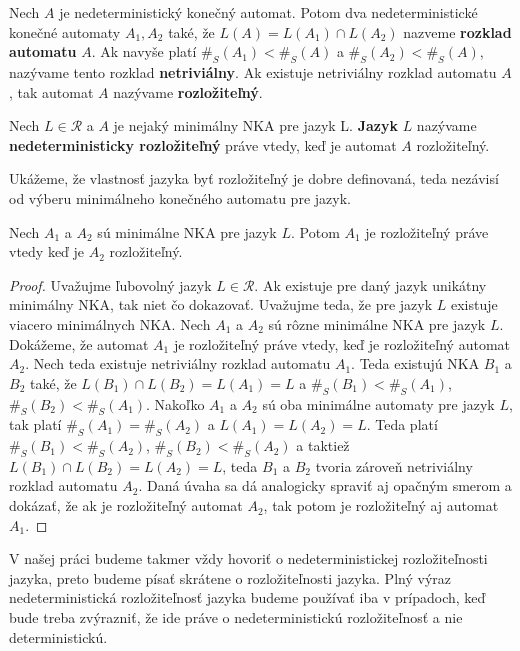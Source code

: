 \begin{definition}
Nech $ A $ je nedeterministický konečný automat. Potom dva nedeterministické konečné automaty $ A_1, A_2 $ také, že $ L(A)=L(A_1) \cap L(A_2) $ nazveme \textbf{rozklad automatu} $ A $. Ak navyše platí $ \#_S(A_1) < \#_S(A)$ a $ \#_S(A_2) < \#_S(A) $, nazývame tento rozklad \textbf{netriviálny}. Ak existuje netriviálny rozklad automatu $ A $, tak automat $ A $ nazývame \textbf{rozložiteľný}.
\end{definition}

\begin{definition}
\label{def:nedeterministic_decomposability_of_language}
Nech $ L \in \mathscr{R} $ a $ A $ je nejaký minimálny NKA pre jazyk L. \textbf{Jazyk} $ L $ nazývame \textbf{nedeterministicky rozložiteľný} práve vtedy, keď je automat $ A $ rozložiteľný.
\end{definition}

Ukážeme, že vlastnosť jazyka byť rozložiteľný je dobre definovaná, teda nezávisí od výberu minimálneho konečného automatu pre jazyk.

\begin{proposition}
Nech $ A_1 $ a $ A_2 $ sú minimálne NKA pre jazyk $ L $. Potom $ A_1 $ je rozložiteľný práve vtedy keď je $ A_2 $ rozložiteľný.
\end{proposition}

\begin{proof}
Uvažujme ľubovolný jazyk $ L \in \mathscr{R} $. Ak existuje pre daný jazyk unikátny minimálny NKA, tak niet čo dokazovať. Uvažujme teda, že pre jazyk $ L $ existuje viacero minimálnych NKA. Nech $ A_1 $ a $ A_2 $ sú rôzne minimálne NKA pre jazyk $ L $. Dokážeme, že automat $ A_1 $ je rozložiteľný práve vtedy, keď je rozložiteľný automat $ A_2 $. Nech teda existuje netriviálny rozklad automatu $ A_1 $. Teda existujú NKA $ B_1 $ a $ B_2 $ také, že $ L(B_1) \cap L(B_2) = L(A_1) = L $ a $ \#_S(B_1) < \#_S(A_1) $, $ \#_S(B_2) < \#_S(A_1) $. Nakoľko $ A_1 $ a $ A_2 $ sú oba minimálne automaty pre jazyk $ L $, tak platí $ \#_S(A_1) = \#_S(A_2) $ a $ L(A_1) = L(A_2) = L $. Teda platí $ \#_S(B_1) < \#_S(A_2) $, $ \#_S(B_2) < \#_S(A_2) $ a taktiež $ L(B_1) \cap L(B_2) = L(A_2) = L $, teda $ B_1 $ a $ B_2 $ tvoria zároveň netriviálny rozklad automatu $ A_2 $. Daná úvaha sa dá analogicky spraviť aj opačným smerom a dokázať, že ak je rozložiteľný automat $ A_2 $, tak potom je rozložiteľný aj automat $ A_1 $.
\end{proof}

\begin{note}
V našej práci budeme takmer vždy hovoriť o nedeterministickej rozložiteľnosti jazyka, preto budeme písať skrátene o rozložiteľnosti jazyka. Plný výraz nedeterministická rozložiteľnosť jazyka budeme používať iba v prípadoch, keď bude treba zvýrazniť, že ide práve o nedeterministickú rozložiteľnosť a nie deterministickú.
\end{note}

